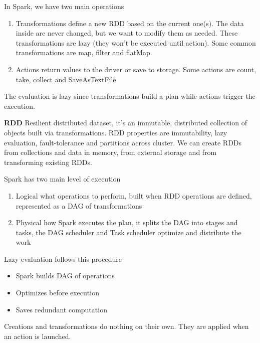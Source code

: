 In Spark, we have two main operations
\begin{enumerate}
    \item Transformations \ra define a new RDD based on the current one(s). The data inside are never changed, but we want to modify them as needed. These transformations are lazy (they won't be executed until action). Some common transformations are map, filter and flatMap.
    \item Actions \ra return values to the driver or save to storage. Some actions are count, take, collect and SaveAsTextFile
\end{enumerate}

The evaluation is lazy since transformations build a plan while actions trigger the execution.

\vspace{10pt}

\textbf{RDD} \ra Resilient distributed dataset, it's an immutable, distributed collection of objects built via transformations. RDD properties are immutability, lazy evaluation, fault-tolerance and partitions across cluster. We can create RDDs from collections and data in memory, from external storage and from transforming existing RDDs.

\vspace{10pt}

Spark has two main level of execution

\begin{enumerate}
    \item Logical \ra what operations to perform, built when RDD operations are defined, represented as a DAG of transformations
    \item Physical \ra how Spark executes the plan, it splits the DAG into stages and tasks, the DAG scheduler and Task scheduler optimize and distribute the work
\end{enumerate}


\vspace{10pt}

Lazy evaluation follows this procedure

\begin{itemize}
    \item Spark builds DAG of operations
    \item Optimizes before execution
    \item Saves redundant computation
\end{itemize}

Creations and transformations do nothing on their own. They are applied when an action is launched. 

